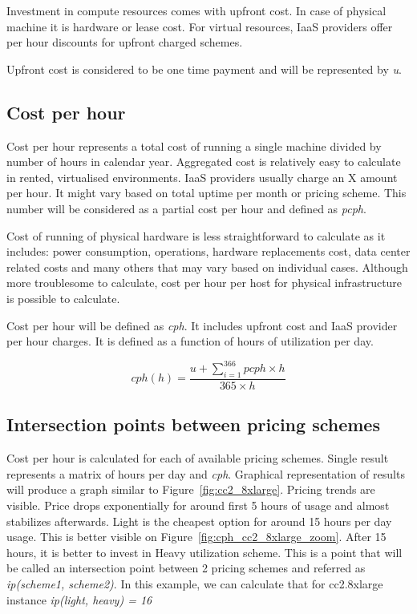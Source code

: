 \documentclass[]{final_report}
\begin{document}
Investment in compute resources comes with upfront cost. In case of physical machine it is hardware or lease cost. For virtual resources, IaaS providers offer per hour discounts for upfront charged schemes. \par
Upfront cost is considered to be one time payment and will be represented by \textit{u}. 

\subsection{Cost per hour}

Cost per hour represents a total cost of running a single machine divided by number of hours in calendar year. Aggregated cost is relatively easy to calculate in rented, virtualised environments. IaaS providers usually charge an X amount per hour. It might vary based on total uptime per month or pricing scheme. This number will be considered as a partial cost per hour and defined as \textit{pcph}. \par
Cost of running of physical hardware is less straightforward to calculate as it includes: power consumption, operations, hardware replacements cost, data center related costs and many others that may vary based on individual cases. Although more troublesome to calculate, cost per hour per host for physical infrastructure is possible to calculate. \par
Cost per hour will be defined as \textit{cph}. It includes upfront cost and IaaS provider per hour charges. It is defined as a function of hours of utilization per day.  

\begin{equation}
cph(h) = \frac{u + \sum_{i=1}^{366} pcph \times h}{365 \times h}
\end{equation}

\subsection{Intersection points between pricing schemes}

Cost per hour is calculated for each of available pricing schemes. Single result represents a matrix of hours per day and \textit{cph}. Graphical representation of results will produce a graph similar to Figure~\ref{fig:cc2_8xlarge}. Pricing trends are visible. Price drops exponentially for around first 5 hours of usage and almost stabilizes afterwards. Light is the cheapest option for around 15 hours per day usage. This is better visible on Figure~\ref{fig:cph_cc2_8xlarge_zoom}. After 15 hours, it is better to invest in Heavy utilization scheme. This is a point that will be called an intersection point between 2 pricing schemes and referred as \textit{ip(scheme1, scheme2)}. In this example, we can calculate that for cc2.8xlarge instance \textit{ip(light, heavy) = 16}
\end{document}
